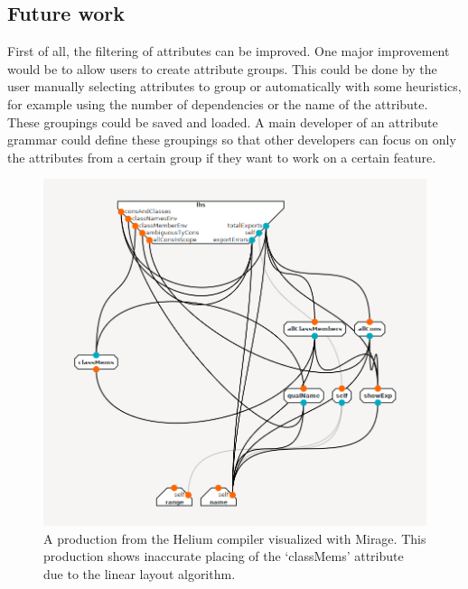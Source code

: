 \documentclass[11pt]{article}
\begin{document}
\subsection{Future work}

First of all, the filtering of attributes can be improved. One major improvement would be to allow users to create attribute groups. This could be done by the user manually selecting attributes to group or automatically with some heuristics, for example using the number of dependencies or the name of the attribute. These groupings could be saved and loaded. A main developer of an attribute grammar could define these groupings so that other developers can focus on only the attributes from a certain group if they want to work on a certain feature.

\begin{figure}[h]
  \centering
  \includegraphics[scale=1.6]{inaccurate-locals-mirage}
  \caption{A production from the Helium compiler visualized with Mirage. This production shows inaccurate placing of the `classMems' attribute due to the linear layout algorithm.}
  \label{inaccurate-locals-mirage}
\end{figure}
\end{document}
